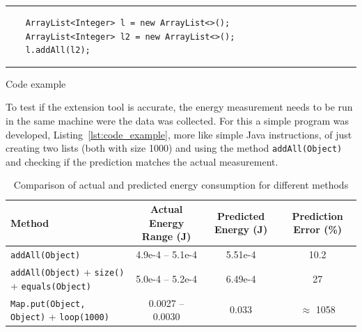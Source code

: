 \begin{listing}[H]
\noindent\rule{\linewidth}{0.4pt}
\begin{verbatim}
    ArrayList<Integer> l = new ArrayList<>();
    ArrayList<Integer> l2 = new ArrayList<>();
    l.addAll(l2);
\end{verbatim}
\noindent\rule{\linewidth}{0.4pt}
\caption{Code example}            
\label{lst:code_example}
\end{listing}

To test if the extension tool is accurate, the energy measurement needs to be run in the same machine were the data was collected.
For this a simple program was developed, Listing~\ref{lst:code_example}, more like simple Java instructions, of just creating two lists (both with size 1000) and using the method \texttt{addAll(Object)} and checking if the prediction matches the actual measurement.

\begin{table}[htbp]
  \centering
  \label{tab:energy_comparison}
  \footnotesize
  \begin{tabular}{>{\raggedright\arraybackslash}p{5cm}ccc}
    \toprule
    Method & Actual Energy Range (J) & Predicted Energy (J) & Prediction Error (\%) \\
    \midrule
    \texttt{addAll(Object)} & 4.9e-4 -- 5.1e-4 & 5.51e-4 & 10.2 \\
    \midrule
    \texttt{addAll(Object)} + \texttt{size()} + \texttt{equals(Object)} & 5.0e-4 -- 5.2e-4 & 6.49e-4 & 27 \\
    \midrule
    \texttt{Map.put(Object, Object)} + \texttt{loop(1000)} & 0.0027 -- 0.0030 & 0.033 & $\approx$ 1058 \\
    \midrule
    \bottomrule
  \end{tabular}
  \vspace{0.5em}
  \caption{Comparison of actual and predicted energy consumption for different methods}
\end{table}




